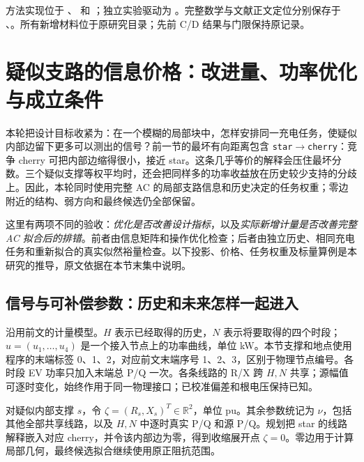 \documentclass[UTF8,fontset=fandol,11pt,a4paper]{ctexart}
\newcommand{\R}{\mathbb R}
\begin{document}
方法实现位于 、 和 ；独立实验驱动为 。完整数学与文献正文定位分别保存于 、。所有新增材料位于原研究目录；先前 C/D 结果与门限保持原记录。

\section{疑似支路的信息价格：改进量、功率优化与成立条件}
\label{si:section}

本轮把设计目标收紧为：在一个模糊的局部块中，怎样安排同一充电任务，使疑似内部边留下更多可以测出的信号？前一节的最坏有向距离包含 \texttt{star}$\to$\texttt{cherry}：竞争 cherry 可把内部边缩得很小，接近 star。这条几乎等价的解释会压住最坏分数。三个疑似支撑等权平均时，还会把同样多的功率收益放在历史较少支持的分歧上。因此，本轮同时使用完整 AC 的局部支路信息和历史决定的任务权重；零边附近的结构、弱方向和最终候选仍全部保留。

这里有两项不同的验收：\emph{优化是否改善设计指标}，以及\emph{实际新增计量是否改善完整 AC 拟合后的排错}。前者由信息矩阵和操作优化检查；后者由独立历史、相同充电任务和重新拟合的真实似然裕量检查。以下投影、价格、任务权重及标量算例是本研究的推导，原文依据在本节末集中说明。

\subsection{信号与可补偿参数：历史和未来怎样一起进入}

沿用前文的计量模型。$H$ 表示已经取得的历史，$N$ 表示将要取得的四个时段；$u=(u_1,\ldots,u_4)$ 是一个接入节点上的功率曲线，单位 kW。本节支撑和地点使用程序的末端标签 0、1、2，对应前文末端序号 1、2、3，区别于物理节点编号。各时段 EV 功率只加入末端总 P/Q 一次。各条线路的 R/X 跨 $H,N$ 共享；源幅值可逐时变化，始终作用于同一物理接口；已校准偏差和根电压保持已知。

对疑似内部支撑 $s$，令 $\zeta=(R_s,X_s)^T\in\R^2$，单位 pu。其余参数统记为 $\nu$，包括其他全部共享线路，以及 $H,N$ 中逐时真实 P/Q 和源 P/Q。规划把 star 的线路解释嵌入对应 cherry，并令该内部边为零，得到收缩展开点 $\zeta=0$。零边用于计算局部几何，最终候选拟合继续使用原正阻抗范围。
\end{document}
